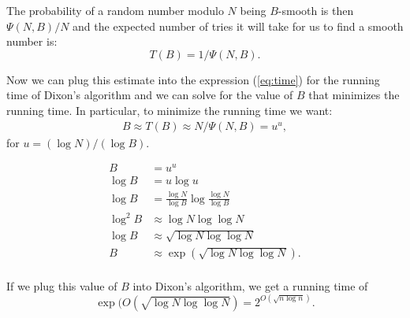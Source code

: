 The probability of a random number modulo $N$ being $B$-smooth is
then $\Psi(N,B)/N$ and the expected number of tries it will
take for us to find a smooth number is:
\[ T(B) = 1/\Psi(N,B).\]

Now we can plug this estimate into the expression (\ref{eq:time})
for the running time of Dixon's algorithm and we can solve
for the value of $B$ that minimizes the running time.
In particular, to minimize the running time we want:
\begin{align*}
  B \approx T(B) \approx N / \Psi(N,B) = u^u,
\end{align*}
for $u = (\log N)/(\log B)$.

\begin{align*}
  B &= u^u\\
  \log B &= u \log u\\
  \log B &= \frac{\log N}{\log B} \log \frac{\log N}{\log B}\\
  \log^2 B &\approx \log N \log \log N\\
\log B &\approx \sqrt{\log N \log \log N}\\
B &\approx \exp(\sqrt{\log N \log \log N}).\\
\end{align*}

If we plug this value of $B$ into Dixon's algorithm,
we get a running time of 
\[ \exp(O(\sqrt{ \log N \log \log N}) = 2^{O(\sqrt{ n \log n })}.\]



